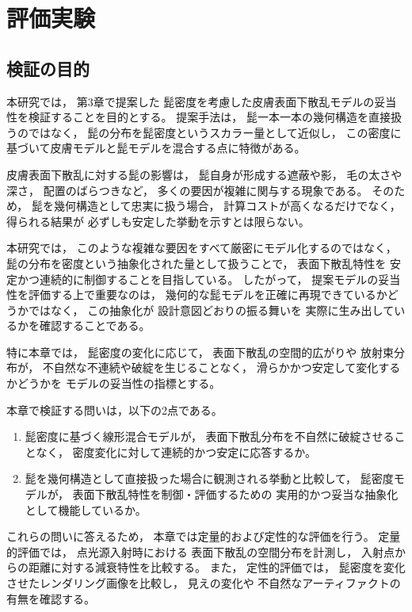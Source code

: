 ﻿\chapter{評価実験}

\section{検証の目的}
本研究では，
第3章で提案した
髭密度を考慮した皮膚表面下散乱モデルの妥当性を検証することを目的とする。
提案手法は，
髭一本一本の幾何構造を直接扱うのではなく，
髭の分布を髭密度というスカラー量として近似し，
この密度に基づいて皮膚モデルと髭モデルを混合する点に特徴がある。

皮膚表面下散乱に対する髭の影響は，
髭自身が形成する遮蔽や影，
毛の太さや深さ，
配置のばらつきなど，
多くの要因が複雑に関与する現象である。
そのため，
髭を幾何構造として忠実に扱う場合，
計算コストが高くなるだけでなく，
得られる結果が
必ずしも安定した挙動を示すとは限らない。

本研究では，
このような複雑な要因をすべて厳密にモデル化するのではなく，
髭の分布を密度という抽象化された量として扱うことで，
表面下散乱特性を
安定かつ連続的に制御することを目指している。
したがって，
提案モデルの妥当性を評価する上で重要なのは，
幾何的な髭モデルを正確に再現できているかどうかではなく，
この抽象化が
設計意図どおりの振る舞いを
実際に生み出しているかを確認することである。

特に本章では，
髭密度の変化に応じて，
表面下散乱の空間的広がりや
放射束分布が，
不自然な不連続や破綻を生じることなく，
滑らかかつ安定して変化するかどうかを
モデルの妥当性の指標とする。

本章で検証する問いは，以下の2点である。
\begin{enumerate}
  \item 髭密度に基づく線形混合モデルが，
        表面下散乱分布を不自然に破綻させることなく，
        密度変化に対して連続的かつ安定に応答するか。
  \item 髭を幾何構造として直接扱った場合に観測される挙動と比較して，
        髭密度モデルが，
        表面下散乱特性を制御・評価するための
        実用的かつ妥当な抽象化として機能しているか。
\end{enumerate}

これらの問いに答えるため，
本章では定量的および定性的な評価を行う。
定量的評価では，
点光源入射時における
表面下散乱の空間分布を計測し，
入射点からの距離に対する減衰特性を比較する。
また，
定性的評価では，
髭密度を変化させたレンダリング画像を比較し，
見えの変化や
不自然なアーティファクトの有無を確認する。


